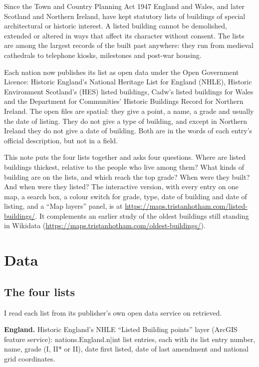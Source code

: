 \documentclass[11pt,a4paper]{article}
\begin{document}
Since the Town and Country Planning Act 1947 England and Wales, and later Scotland and Northern Ireland, have kept statutory lists of buildings of special architectural or historic interest. A listed building cannot be demolished, extended or altered in ways that affect its character without consent. The lists are among the largest records of the built past anywhere: they run from medieval cathedrals to telephone kiosks, milestones and post-war housing.

Each nation now publishes its list as open data under the Open Government Licence: Historic England's National Heritage List for England (NHLE), Historic Environment Scotland's (HES) listed buildings, Cadw's listed buildings for Wales and the Department for Communities' Historic Buildings Record for Northern Ireland. The open files are spatial: they give a point, a name, a grade and usually the date of listing. They do not give a type of building, and except in Northern Ireland they do not give a date of building. Both are in the words of each entry's official description, but not in a field.

This note puts the four lists together and asks four questions. Where are listed buildings thickest, relative to the people who live among them? What kinds of building are on the lists, and which reach the top grade? When were they built? And when were they listed? The interactive version, with every entry on one map, a search box, a colour switch for grade, type, date of building and date of listing, and a ``Map layers'' panel, is at \url{https://maps.tristanhotham.com/listed-buildings/}. It complements an earlier study of the oldest buildings still standing in Wikidata (\url{https://maps.tristanhotham.com/oldest-buildings/}).

\section{Data}

\subsection{The four lists}

I read each list from its publisher's own open data service on {{retrieved}}.

\textbf{England.} Historic England's NHLE ``Listed Building points'' layer (ArcGIS feature service): {{nations.England.n|int}} list entries, each with its list entry number, name, grade (I, II* or II), date first listed, date of last amendment and national grid coordinates.
\end{document}
